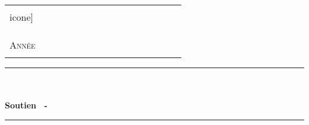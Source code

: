 %
%



  \begin{center} %


	\begin{center}
		\begin{tabular}{p{0.2\linewidth}p{0.6\linewidth}}
			\begin{minipage}{\linewidth}
				\begin{center}
					\texttt{[image: \\icone]}\\[0.5cm]
				\end{center}
			\end{minipage}
		&

			\begin{minipage}{\linewidth}
				\begin{center}
					\textsc{\LARGE \etablissement}\\[0.5cm]
    				\textsc{\large \discipline}\\[0.5cm]
					\textsc{\Large \classe}\\[0.5cm]

					\textsc{\Large Année \annee}\\[1cm]
				\end{center}
			\end{minipage}
		\end{tabular}
	\end{center}
	\vspace{0.6cm}

    
    \rule{\linewidth}{0.5mm}\\[0.4cm]

    {\textsc{\partie}}\\[0.4cm]

    { \huge \bfseries Soutien \numero\ - \titre }\\[0.4cm]

    \rule{\linewidth}{0.5mm}\\[1cm]


  \end{center}	%



